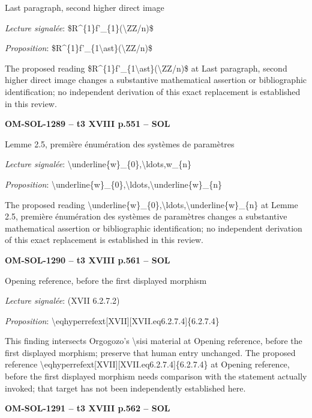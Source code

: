 Last paragraph, second higher direct image\par
\emph{Lecture signalée}: \$R\textasciicircum{}\{1\}f'\_\{1\}(\textbackslash{}ZZ/n)\$\par
\emph{Proposition}: \$R\textasciicircum{}\{1\}f'\_\{1\textbackslash{}ast\}(\textbackslash{}ZZ/n)\$\par
The proposed reading \$R\textasciicircum{}\{1\}f'\_\{1\textbackslash{}ast\}(\textbackslash{}ZZ/n)\$ at Last paragraph, second higher direct image changes a substantive mathematical assertion or bibliographic identification; no independent derivation of this exact replacement is established in this review.\par
\par\noindent\textbf{OM-SOL-1289 -- t3 XVIII p.551 -- SOL}\par
Lemme 2.5, première énumération des systèmes de paramètres\par
\emph{Lecture signalée}: \textbackslash{}underline\{w\}\_\{0\},\textbackslash{}ldots,w\_\{n\}\par
\emph{Proposition}: \textbackslash{}underline\{w\}\_\{0\},\textbackslash{}ldots,\textbackslash{}underline\{w\}\_\{n\}\par
The proposed reading \textbackslash{}underline\{w\}\_\{0\},\textbackslash{}ldots,\textbackslash{}underline\{w\}\_\{n\} at Lemme 2.5, première énumération des systèmes de paramètres changes a substantive mathematical assertion or bibliographic identification; no independent derivation of this exact replacement is established in this review.\par
\par\noindent\textbf{OM-SOL-1290 -- t3 XVIII p.561 -- SOL}\par
Opening reference, before the first displayed morphism\par
\emph{Lecture signalée}: (XVII 6.2.7.2)\par
\emph{Proposition}: \textbackslash{}eqhyperrefext[XVII][XVII.eq6.2.7.4]\{6.2.7.4\}\par
This finding intersects Orgogozo's \textbackslash{}sisi material at Opening reference, before the first displayed morphism; preserve that human entry unchanged. The proposed reference \textbackslash{}eqhyperrefext[XVII][XVII.eq6.2.7.4]\{6.2.7.4\} at Opening reference, before the first displayed morphism needs comparison with the statement actually invoked; that target has not been independently established here.\par
\par\noindent\textbf{OM-SOL-1291 -- t3 XVIII p.562 -- SOL}\par
